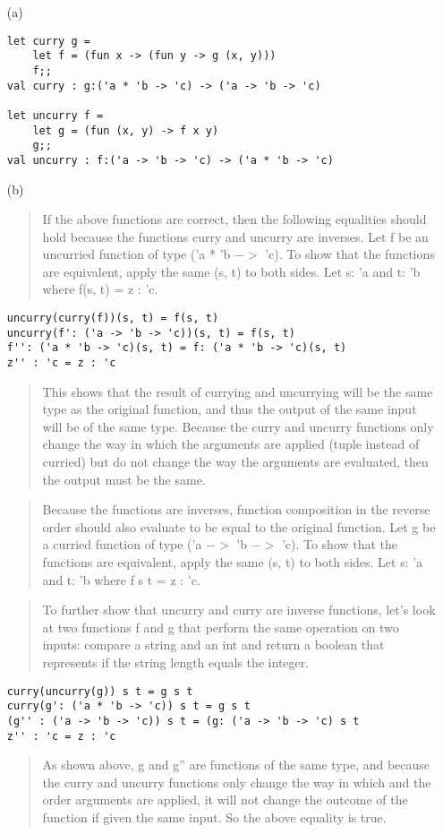 \documentclass[10pt]{article}
\begin{document}
\begin{enumerate}
\item[(a)]
\begin{verbatim}
let curry g = 
	let f = (fun x -> (fun y -> g (x, y)))
	f;;
val curry : g:('a * 'b -> 'c) -> ('a -> 'b -> 'c)

let uncurry f =
	let g = (fun (x, y) -> f x y)
	g;;
val uncurry : f:('a -> 'b -> 'c) -> ('a * 'b -> 'c)

\end{verbatim}
\item[(b)]
\begin{verse} If the above functions are correct, then the following equalities should hold because the functions curry and uncurry are inverses. Let f be an uncurried function of type ('a * 'b $->$ 'c). To show that the functions are equivalent, apply the same (s, t) to both sides. Let s: 'a and t: 'b where f(s, t) = z : 'c.
\end{verse}
\begin{verbatim}
uncurry(curry(f))(s, t) = f(s, t)
uncurry(f': ('a -> 'b -> 'c))(s, t) = f(s, t)
f'': ('a * 'b -> 'c)(s, t) = f: ('a * 'b -> 'c)(s, t)
z'' : 'c = z : 'c
\end{verbatim}
\begin{verse}
This shows that the result of currying and uncurrying will be the same type as the original function, and thus the output of the same input will be of the same type. Because the curry and uncurry functions only change the way in which the arguments are applied (tuple instead of curried) but do not change the way the arguments are evaluated, then the output must be the same. 
\end{verse}
\begin{verse}
Because the functions are inverses, function composition in the reverse order should also evaluate to be equal to the original function. Let g be a curried function of type ('a $->$ 'b $->$ 'c). To show that the functions are equivalent, apply the same (s, t) to both sides. Let s: 'a and t: 'b where f s t = z : 'c.
\end{verse}
\begin{verse}
To further show that uncurry and curry are inverse functions, let's look at two functions f and g that perform the same operation on two inputs: compare a string and an int and return a boolean that represents if the string length equals the integer.
\end{verse}
\begin{verbatim}
curry(uncurry(g)) s t = g s t
curry(g': ('a * 'b -> 'c)) s t = g s t
(g'' : ('a -> 'b -> 'c)) s t = (g: ('a -> 'b -> 'c) s t
z'' : 'c = z : 'c
\end{verbatim}
\begin{verse}
As shown above, g and g'' are functions of the same type, and because the curry and uncurry functions only change the way in which and the order arguments are applied, it will not change the outcome of the function if given the same input. So the above equality is true.
\end{verse}
\end{enumerate}
\end{document}
